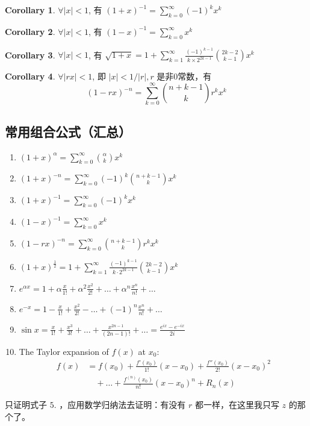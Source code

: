 \documentclass[oneside]{book}
\theoremstyle{definition}
\newtheorem{corollary}{Corollary}[section]
\begin{document}
\begin{corollary}
	\(\forall |x| < 1\), 有 \((1 + x)^{-1} = \sum_{k=0}^{\infty} (-1)^k x^k\)
\end{corollary}

\begin{corollary}
	\(\forall |x| < 1\), 有 \((1 - x)^{-1} = \sum_{k=0}^{\infty} x^k\)
\end{corollary}

\begin{corollary}
	\(\forall |x| < 1\), 有 \(\sqrt{1 + x} = 1 + \sum_{k=1}^{\infty} \frac{(-1)^{k-1}}{k \times 2^{2k-1}} \binom{2k - 2}{k - 1} x^k\)
\end{corollary}

\begin{corollary}
	\(\forall |rx| < 1\), 即 \(|x| < 1 / |r|, r\) 是非0常数，有
	\[(1 - r x)^{-n} = \sum_{k=0}^{\infty} \binom{n + k - 1}{k} r^k x^k\]
\end{corollary}
\subsection{常用组合公式（汇总）}
\begin{enumerate}
	\item \( (1 + x)^{\alpha} = \sum_{k=0}^{\infty} \binom{\alpha}{k} x^k \)
	\item \( (1 + x)^{-n} = \sum_{k=0}^{\infty} (-1)^k \binom{n + k - 1}{k} x^k \)
	\item \( (1 + x)^{-1} = \sum_{k=0}^{\infty} (-1)^k x^k \)
	\item \( (1 - x)^{-1} = \sum_{k=0}^{\infty} x^k \)
	\item \( (1 - r x)^{-n} = \sum_{k=0}^{\infty} \binom{n + k - 1}{k} r^k x^k \)
	\item \( (1 + x)^{\frac{1}{2}} = 1 + \sum_{k=1}^{\infty} \frac{(-1)^{k-1}}{k \cdot 2^{2k-1}} \binom{2k - 2}{k - 1} x^k \)
	\item \( e^{\alpha x} = 1 + \alpha \frac{x}{1!} + \alpha^2 \frac{x^2}{2!} + \dots + \alpha^n \frac{x^n}{n!} + \dots \)
	\item \( e^{-x} = 1 - \frac{x}{1!} + \frac{x^2}{2!} - \dots + (-1)^n \frac{x^n}{n!} + \dots \)
	\item \( \sin x = \frac{x}{1!} + \frac{x^3}{3!} + \dots + \frac{x^{2n-1}}{(2n-1)!} + \dots = \frac{e^{ix} - e^{-ix}}{2i} \)
	\item The Taylor expansion of \( f(x) \) at \( x_0 \):
	\[
	\begin{aligned}
		f(x) &= f(x_0) + \frac{f'(x_0)}{1!}(x - x_0) + \frac{f''(x_0)}{2!}(x - x_0)^2 \\
		&\quad + \dots + \frac{f^{(n)}(x_0)}{n!}(x - x_0)^n + R_n(x)
	\end{aligned}
	\]
	
\end{enumerate}
只证明式子 \(5.\) ，应用数学归纳法去证明：有没有 \(r\) 都一样，在这里我只写 \( z\) 的那个了。
\end{document}
